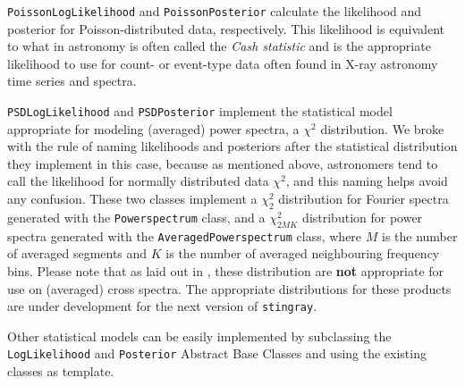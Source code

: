 \documentclass[twocolumn]{aastex62}
\newcommand{\stingray}{\texttt{stingray}\xspace}
\newcommand{\powerspectrum}{\texttt{Powerspectrum}\xspace}
\begin{document}
\texttt{PoissonLogLikelihood} and \texttt{PoissonPosterior} calculate the likelihood and posterior for Poisson-distributed data, respectively. This likelihood is equivalent to what in astronomy is often called the \textit{Cash statistic} \citep{cash1979} and is the appropriate likelihood to use for count- or event-type data often found in X-ray astronomy time series and spectra.

\texttt{PSDLogLikelihood} and \texttt{PSDPosterior} implement the statistical model appropriate for modeling (averaged) power spectra, a $\chi^2$ distribution. 
We broke with the rule of naming likelihoods and posteriors after the statistical distribution they implement in this case, because as mentioned above, astronomers tend to call the likelihood for normally distributed data $\chi^2$, and this naming helps avoid any confusion. 
These two classes implement a $\chi^2_2$ distribution for Fourier spectra generated with the \powerspectrum class, and a $\chi^2_{2MK}$ distribution for power spectra generated with the \texttt{AveragedPowerspectrum} class, where $M$ is the number of averaged segments and $K$ is the number of averaged neighbouring frequency bins. 
Please note that as laid out in \citet{huppenkothen2017}, these distribution are \textbf{not} appropriate for use on (averaged) cross spectra. 
The appropriate distributions for these products are under development for the next version of \stingray.

Other statistical models can be easily implemented by subclassing the \texttt{LogLikelihood} and \texttt{Posterior} Abstract Base Classes and using the existing classes as template.
\end{document}
